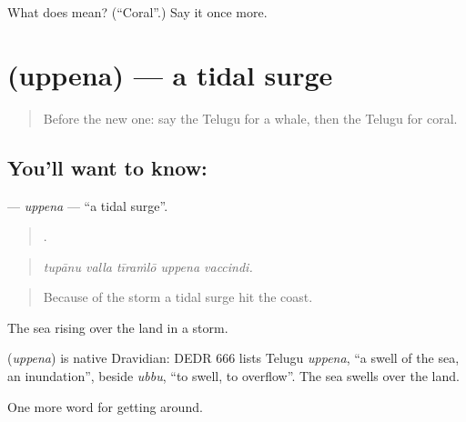 \begin{tcolorbox}[breakable,colback=teal!4,colframe=teal!35!black,title={Before you move on}]
What does  mean? (\textquotedblleft{}Coral\textquotedblright{}.) Say it once more.
\end{tcolorbox}
\section[\texorpdfstring{\te{ఉప్పెన} (uppena)}{ఉప్పెన (uppena)}]{ (uppena) — a tidal surge}

\label{lesson:TE-C473-uppena}



\begin{quote}
Before the new one: say the Telugu for a whale, then the Telugu for coral.
\end{quote}

\subsection*{You'll want to know: }
\textbf{} — \emph{uppena} — \textquotedblleft{}a tidal surge\textquotedblright{}.

\begin{quote}
    .
\end{quote}

\begin{quote}
\emph{tupānu valla tīraṁlō uppena vaccindi.}
\end{quote}

\begin{quote}
Because of the storm a tidal surge hit the coast.
\end{quote}

The sea rising over the land in a storm.

\begin{cousinweb}
\textbf{} (\emph{uppena}) is native Dravidian: DEDR 666 lists Telugu \emph{uppena}, \textquotedblleft{}a swell of the sea, an inundation\textquotedblright{}, beside \emph{ubbu}, \textquotedblleft{}to swell, to overflow\textquotedblright{}. The sea swells over the land.
\end{cousinweb}

\begin{grammarlens}[title={What you've built}]
One more word for getting around.
\end{grammarlens}

